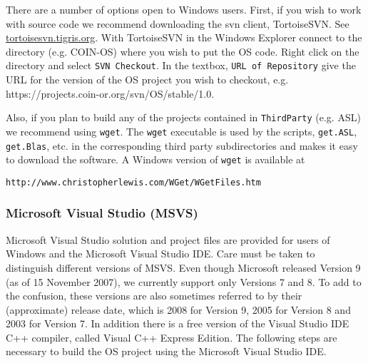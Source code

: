 \documentclass[11pt]{article}
\renewcommand{\_}{{\char"5F}}
\renewcommand{\{}{{\char"7B}}
\renewcommand{\}}{{\char"7D}}
\renewcommand{\^}{{\char"0D}}
\renewcommand{\'}{{\char"0D}}
\begin{document}
There are a number of options open to Windows users.   First, if you wish to work with source code we recommend downloading  the svn client,  TortoiseSVN.  See \url{tortoisesvn.tigris.org}.  With TortoiseSVN in the Windows Explorer connect to the directory (e.g. COIN-OS) where you wish to put the OS code. Right click on the directory and select {\tt SVN Checkout}.   In the textbox, {\tt URL of Repository} give the URL for the version of the OS project you wish to checkout, e.g. https://projects.coin-or.org/svn/OS/stable/1.0.

Also, if you plan to build any of the projects contained in {\tt ThirdParty} (e.g. ASL) we recommend using {\tt wget}.  The {\tt wget} executable is used by the scripts, {\tt get.ASL}, {\tt get.Blas}, etc. in the corresponding third party subdirectories and makes it easy to download the software.  A Windows version of {\tt wget} is available at

\begin{verbatim}
http://www.christopherlewis.com/WGet/WGetFiles.htm
\end{verbatim}



\subsubsection{Microsoft Visual Studio (MSVS)}





Microsoft Visual Studio solution and project files are provided for users of Windows and the Microsoft Visual Studio IDE.   Care must be taken to distinguish different versions of MSVS.   Even though Microsoft  released Version 9 (as of 15 November 2007), we currently support only  Versions 7 and 8. To add to the confusion, these versions are also sometimes referred to by their (approximate) release date, which is 2008 for Version 9, 2005 for Version 8 and 2003 for Version 7.   In addition there is a free version of the Visual Studio IDE C++ compiler,  called Visual C++ Express Edition.    The following steps are necessary to build the OS project using the  Microsoft Visual Studio IDE.
\end{document}
